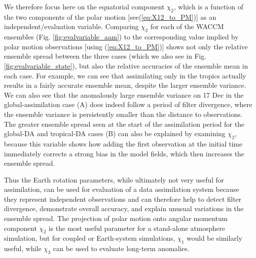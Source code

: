 We therefore focus here on the equatorial component $\chi_2$, which is a function of the two components of the polar motion [see(\ref{eq:X12_to_PM})] as an independent/evaluation variable. 
Comparing $\chi_2$ for each of the WACCM ensembles (Fig. \ref{fig:evalvariable_aam}) to the corresponding value implied by polar motion observations [using (\ref{eq:X12_to_PM})] 
shows not only the relative ensemble spread between the three cases (which we also see in Fig. \ref{fig:evalvariable_state}), but also the relative accuracies of the ensemble mean in each case. 
For example, we can see that assimilating only in the tropics actually results in a fairly accurate ensemble mean, despite the larger ensemble variance. 
We can also see that the anomalously large ensemble variance on 17 Dec in the global-assimilation case (A) does indeed follow a period of filter divergence, where the ensemble variance is persistently smaller than the distance to observations. 
The greater ensemble spread seen at the start of the assimilation period for the global-DA and tropical-DA cases (B) can also be explained by examining $\chi_2$, because this variable shows how adding the first observation at the initial time immediately corrects 
a strong bias in the model fields, which then increases the ensemble spread. 

Thus the Earth rotation parameters, while ultimately not very useful for assimilation, can be used for evaluation of a data assimilation system because they represent independent observations and can therefore help to detect filter divergence, demonstrate overall accuracy, and explain unusual variations in the ensemble spread. 
The projection of polar motion onto angular momentum component $\chi_2$ is the most useful parameter for a stand-alone atmosphere simulation, but for coupled or Earth-system simulations, $\chi_1$ would be similarly useful, while $\chi_3$ can be used to evaluate long-term anomalies. 
